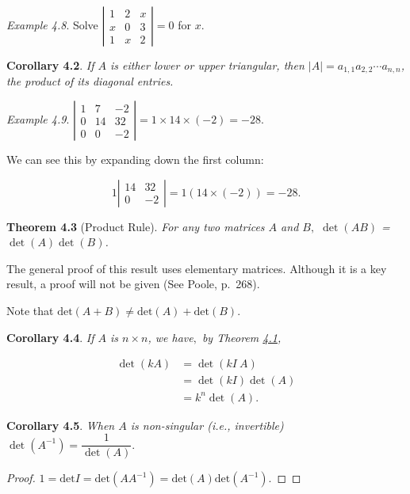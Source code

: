 \documentclass[
  letterpaper,
  DIV=11,
  numbers=noendperiod]{scrartcl}
\theoremstyle{remark}
\begin{document}
\emph{Example 4.8}. Solve \(\left|
\begin{array}{ccc}
1 & 2 & x \\
x & 0 & 3 \\
1 & x & 2
\end{array}
\right| =0\) for \(x.\)

\textbf{Corollary 4.2}. \emph{If \(A\) is either lower or upper
triangular, then \(\left|
A\right| =a_{1,1}a_{2,2}\cdots a_{n,n}\), the product of its diagonal
entries.}

\emph{Example 4.9}. \(\left|\begin{array}{rrr}
1 & 7 & -2 \\
0 & 14 & 32 \\
0 & 0 & -2
\end{array}\right| = 1\times 14\times (-2)=-28\).

We can see this by expanding down the first column:

\[1\left|\begin{array}{rr} 14 & 32 \\
0 & -2
\end{array}\right|=1(14\times (-2))=-28.\]

\textbf{Theorem 4.3} (Product Rule). \emph{For any two matrices \(A\)
and \(B,\) \(\det (AB)\) = \(\det (A) \det (B)\).}

The general proof of this result uses elementary matrices. Although it
is a key result, a proof will not be given (See Poole, p.~268).

Note that \(\textrm{det}(A+B)\neq \textrm{det}(A)+\textrm{det}(B)\).

\textbf{Corollary 4.4}. \emph{If \(A\) is \(n\times n\), we have\(,\) by
Theorem \hyperref[calcdet]{4.1},}

\emph{\[\begin{aligned}
\det \left( kA\right) &= \det \left( kI \  A\right) \\
&=
\det \left( kI\right)  \det \left( A\right) \\
&= k^{n}
\det \left( A\right) .
\end{aligned}\]}

\textbf{Corollary 4.5}. \emph{When \(A\) is non-singular (i.e.,
invertible)
\(\det \left(A^{-1}\right) =\dfrac{1}{\det \left( A\right) }.\)}

\begin{proof}
\(1=\textrm{det}{I}=\textrm{det}(AA^{-1})=\textrm{det}(A)\textrm{det}(A^{-1})\).~◻
\end{proof}
\end{document}
